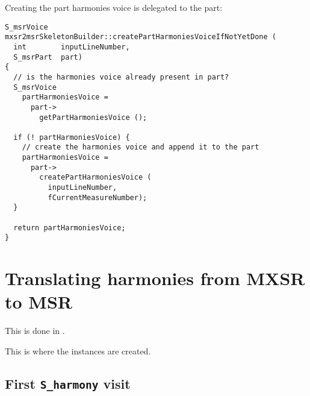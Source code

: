 Creating the part harmonies voice is delegated to the part:
\begin{lstlisting}[language=CPlusPlus]
S_msrVoice mxsr2msrSkeletonBuilder::createPartHarmoniesVoiceIfNotYetDone (
  int        inputLineNumber,
  S_msrPart  part)
{
  // is the harmonies voice already present in part?
  S_msrVoice
    partHarmoniesVoice =
      part->
        getPartHarmoniesVoice ();

  if (! partHarmoniesVoice) {
    // create the harmonies voice and append it to the part
    partHarmoniesVoice =
      part->
        createPartHarmoniesVoice (
          inputLineNumber,
          fCurrentMeasureNumber);
  }

  return partHarmoniesVoice;
}
\end{lstlisting}


\section{Translating harmonies from MXSR to MSR}%

This is done in \mxsrToMsr{}.

This is where the  instances are created.


\subsection{First {\tt S_harmony} visit}

